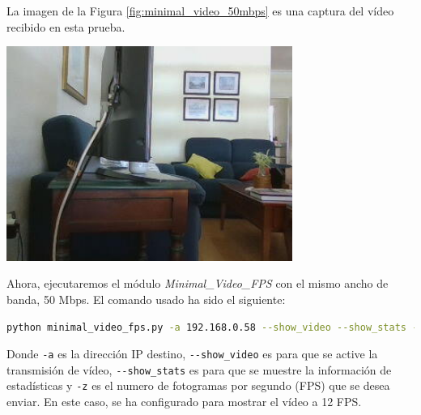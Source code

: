 \newpage

La imagen de la Figura \ref{fig:minimal_video_50mbps} es una captura del vídeo recibido en esta prueba.
\begin{center}
  \includegraphics[width = 0.7\textwidth]{images/VideoRecibido3.1.png}
  \label{fig:minimal_video_50mbps}
\end{center}

\newpage
Ahora, ejecutaremos el módulo \textit{Minimal\_Video\_FPS} con el mismo ancho de banda, 50 Mbps. El comando usado ha sido el siguiente:
\begin{lstlisting}[language=bash, basicstyle=\ttfamily\scriptsize]
    python minimal_video_fps.py -a 192.168.0.58 --show_video --show_stats -z 12
\end{lstlisting}
Donde \verb|-a| es la dirección IP destino, \verb|--show_video| es para que se active la transmisión de vídeo, \verb|--show_stats| es para que se muestre la información de estadísticas y \verb|-z| es el numero de fotogramas por segundo (FPS) que se desea enviar. En este caso, se ha configurado para mostrar el vídeo a 12 FPS.
\vspace{\baselineskip}

